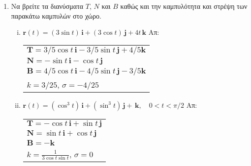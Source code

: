 \begin{enumerate}
  \item Να βρείτε τα διανύσματα $ T $, $N$ και $B$ καθώς και την καμπυλότητα και στρέψη  
    των παρακάτω καμπυλών στο χώρο.
    \begin{enumerate}[i)]
      \item $ \mathbf{r}(t)=(3 \sin{t})\, \mathbf{i} + (3 \cos{t})\, \mathbf{j} + 4t 
        \, \mathbf{k} $ 
        \hfill Απ: \begin{tabular}{l}
          $ \mathbf{T}=  3/5 \cos{t}\,\mathbf{i} - 3/5 \sin{t} \,\mathbf{j} + 4/5 
          \mathbf{k} $ \\
          $ \mathbf{N}=  - \sin{t}\,\mathbf{i} - \cos{t}\,\mathbf{j} $ \\
          $ \mathbf{Β}=  4/5 \cos{t}\,\mathbf{i} - 4/5\sin{t}\,\mathbf{j}-3/5 
          \mathbf{k} $ \\
          $ k = 3/25 $, $ \sigma = -4/25 $
        \end{tabular} 
      \item $ \mathbf{r}(t)=(\cos^{3}{t})\, \mathbf{i} + (\sin^{3}{t})\, \mathbf{j} + \,
        \mathbf{k} , \quad 0<t< \pi /2$ 
        \hfill Απ: \begin{tabular}{l}
          $ \mathbf{T}=  - \cos{t}\,\mathbf{i} + \sin{t}\,\mathbf{j}$ \\
          $ \mathbf{N}=  \sin{t}\,\mathbf{i} + \cos{t}\,\mathbf{j} $ \\
          $ \mathbf{B}= -\mathbf{k} $ \\
          $ k = \frac{1}{3 \cos{t} \sin{t}} $, $ \sigma = 0 $ 
        \end{tabular} 
    \end{enumerate}
\end{enumerate}




